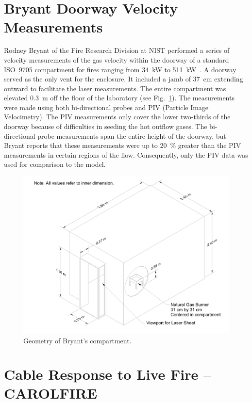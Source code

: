 \section{Bryant Doorway Velocity Measurements}

Rodney Bryant of the Fire Research Division at NIST performed a series of velocity measurements of the gas velocity within the doorway of a standard ISO~9705 compartment for fires ranging from 34~kW to 511~kW~\cite{Bryant:FSJ2009,Bryant:EF2009,Bryant:CS2010}. A doorway served as the only vent for the enclosure. It included a jamb of 37~cm extending outward to facilitate the laser measurements. The entire compartment was elevated 0.3~m off the floor of the laboratory (see Fig.~\ref{Bryant_Drawing}). The measurements were made using both bi-directional probes and PIV (Particle Image Velocimetry). The PIV measurements only cover the
lower two-thirds of the doorway because of difficulties in seeding the hot outflow gases. The bi-directional probe measurements span the entire height of the doorway, but Bryant reports that these measurements were up to 20~\% greater than the PIV measurements in certain regions of the flow. Consequently, only the PIV data was used for comparison to the model.

\begin{figure}[ht]
\includegraphics[width=\textwidth]{FIGURES/Bryant_Doorway/Bryant_Compartment}
\caption[Geometry of Bryant's compartment]{Geometry of Bryant's compartment.}
\label{Bryant_Drawing}
\end{figure}


\section{Cable Response to Live Fire -- CAROLFIRE}

